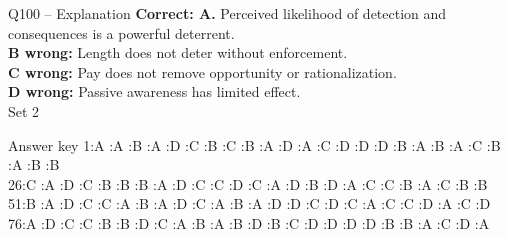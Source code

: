 \documentclass[aspectratio=169,10pt]{beamer}
\begin{document}
\begin{frame}[t]{Q100 -- Explanation}
	\footnotesize
	\textbf{Correct: A.} Perceived likelihood of detection and consequences is a powerful deterrent. \\[5pt]
\textbf{B wrong:} Length does not deter without enforcement. \\[3pt]
\textbf{C wrong:} Pay does not remove opportunity or rationalization. \\[3pt]
\textbf{D wrong:} Passive awareness has limited effect. \\[3pt]
	\vfill {\tiny Set 2}
\end{frame}

\begin{frame}{Answer key}
\small
1:A :A :B :A :D :C :B :C :B :A :D :A :C :D :D :D :B :A :B :A :C :B :A :B :B \\[6pt]
26:C :A :D :C :B :B :B :A :D :C :C :D :C :A :D :B :D :A :C :C :B :A :C :B :B \\[6pt]
51:B :A :D :C :C :A :B :A :D :C :A :B :A :D :D :C :D :C :A :C :C :D :A :C :D \\[6pt]
76:A :D :C :C :B :B :D :C :A :B :A :B :D :B :C :D :D :D :D :B :B :A :C :D :A
\end{frame}
\end{document}
